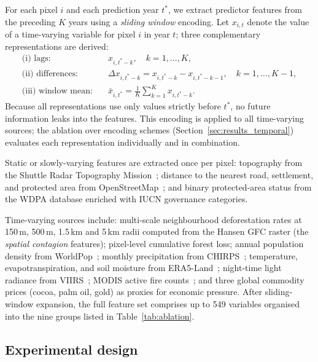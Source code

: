 \documentclass{iopart}
\begin{document}
For each pixel $i$ and each prediction year $t^*$, we extract
predictor features from the preceding $K$ years using a \emph{sliding
window} encoding.
Let $x_{i,t}$ denote the value of a time-varying variable for pixel $i$
in year $t$; three complementary representations are derived:
\begin{align}
  \text{(i)~lags:} &\quad x_{i,t^*-k}, \quad k = 1, \ldots, K, \label{eq:lags} \\
  \text{(ii)~differences:} &\quad \Delta x_{i,t^*-k} = x_{i,t^*-k} - x_{i,t^*-k-1}, \quad k = 1, \ldots, K{-}1, \label{eq:diff} \\
  \text{(iii)~window mean:} &\quad \bar{x}_{i,t^*} = \frac{1}{K}\sum_{k=1}^{K} x_{i,t^*-k}. \label{eq:wmean}
\end{align}
Because all representations use only values strictly before $t^*$,
no future information leaks into the features.
This encoding is applied to all time-varying sources;
the ablation over encoding schemes (Section~\ref{sec:results_temporal})
evaluates each representation individually and in combination.

Static or slowly-varying features are extracted once per pixel:
topography from the Shuttle Radar Topography Mission~\cite{Farr2007};
distance to the nearest road, settlement, and protected area from
OpenStreetMap~\cite{OSM2024}; and binary protected-area status from
the WDPA database enriched with IUCN governance categories.

Time-varying sources include:
multi-scale neighbourhood deforestation rates at 150\,m, 500\,m,
1.5\,km and 5\,km radii computed from the Hansen GFC raster
(the \emph{spatial contagion} features);
pixel-level cumulative forest loss;
annual population density from WorldPop~\cite{Tatem2017};
monthly precipitation from CHIRPS~\cite{Funk2015};
temperature, evapotranspiration, and soil moisture from
ERA5-Land~\cite{MunozSabater2021};
night-time light radiance from VIIRS~\cite{Elvidge2017};
MODIS active fire counts~\cite{Giglio2016};
and three global commodity prices (cocoa, palm oil, gold)
as proxies for economic pressure.
After sliding-window expansion, the full feature set comprises
up to 549 variables organised into the nine groups
listed in Table~\ref{tab:ablation}.

\subsection{Experimental design}
\end{document}
